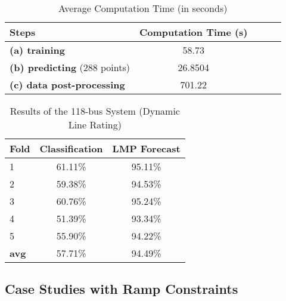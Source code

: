 \documentclass[letterpaper, 11pt]{article}
\theoremstyle{plain}
\theoremstyle{definition}
\begin{document}
\begin{table}[htbp]
  \caption{Average Computation Time (in seconds)}
  \label{tab:avg_cal_time_per_step}
  \centering

  \begin{tabular}{l|cccc}
  \hline

  \hline
  \textbf{Steps} & \textbf{Computation Time (s)}\\
  \hline
  \textbf{(a) training}  & 58.73 \\
  \textbf{(b) predicting} (288 points)  & 26.8504  \\
  \textbf{(c) data post-processing} & 701.22 \\
  \hline

  \hline
  \end{tabular}
\end{table}

\begin{table}[htbp]
  \caption{Results of the 118-bus System (Dynamic Line Rating)}
  \label{tab:classification_accuracy_118bus}
  \centering

  \begin{tabular}{l|cc}
  \hline

  \hline
  \textbf{Fold} & \textbf{Classification} & \textbf{LMP Forecast} \\
  \hline
    1 & 61.11\% & 95.11\% \\
    2 & 59.38\% & 94.53\% \\
    3 & 60.76\% & 95.24\% \\
    4 & 51.39\% & 93.34\% \\
    5 & 55.90\% & 94.22\% \\
  \hline
  \textbf{avg} & 57.71\% & 94.49\% \\
  \hline

  \hline
  \end{tabular}
\end{table}














\subsection{Case Studies with Ramp Constraints} \label{sub:ramp_constraints}
\end{document}
